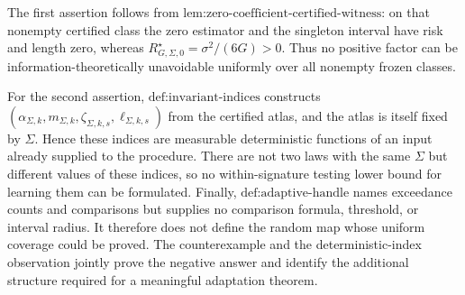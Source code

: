 The first assertion follows from \(\text{lem:zero-coefficient-certified-witness}\): on that nonempty certified class the zero estimator and the singleton interval have risk and length zero, whereas \(R_{G,\Sigma,0}^{\star}=\sigma^2/(6G)>0\). Thus no positive factor can be information-theoretically unavoidable uniformly over all nonempty frozen classes.

For the second assertion, \(\text{def:invariant-indices}\) constructs \((\alpha_{\Sigma,k},m_{\Sigma,k},\zeta_{\Sigma,k,s},\ell_{\Sigma,k,s})\) from the certified atlas, and the atlas is itself fixed by \(\Sigma\). Hence these indices are measurable deterministic functions of an input already supplied to the procedure. There are not two laws with the same \(\Sigma\) but different values of these indices, so no within-signature testing lower bound for learning them can be formulated. Finally, \(\text{def:adaptive-handle}\) names exceedance counts and comparisons but supplies no comparison formula, threshold, or interval radius. It therefore does not define the random map whose uniform coverage could be proved. The counterexample and the deterministic-index observation jointly prove the negative answer and identify the additional structure required for a meaningful adaptation theorem.